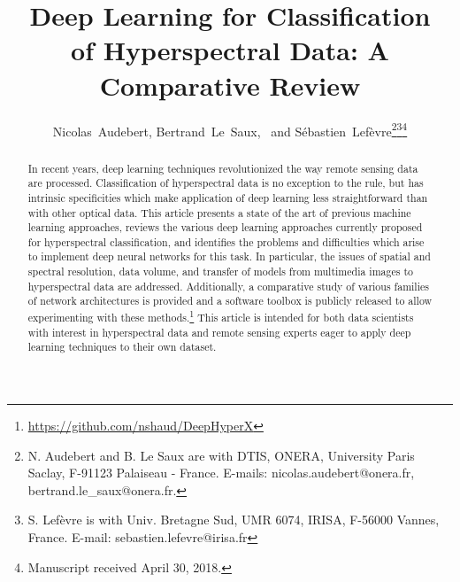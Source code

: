 \documentclass[journal]{IEEEtran}
\begin{document}
\title{Deep Learning for Classification\\ of Hyperspectral Data: A Comparative Review}


\author{Nicolas~Audebert, Bertrand~Le~Saux,~
    and    S{\'e}bastien~Lef{\`e}vre\thanks{N. Audebert and B. {Le Saux} are with DTIS, ONERA, University Paris Saclay, F-91123 Palaiseau - France. E-mails:  \mbox{nicolas.audebert@onera.fr}, \mbox{bertrand.le\_saux@onera.fr}.}\thanks{S. Lef{\`e}vre is with Univ. Bretagne Sud, UMR 6074, IRISA, F-56000 Vannes, France. E-mail: sebastien.lefevre@irisa.fr}\thanks{Manuscript received April 30, 2018.}}























\maketitle



\begin{abstract}
In recent years, deep learning techniques revolutionized the way remote sensing data are processed. Classification of hyperspectral data is no exception to the rule, but has intrinsic specificities which make application of deep learning less straightforward than with other optical data. This article presents a state of the art of previous machine learning approaches, reviews the various deep learning approaches currently proposed for hyperspectral classification, and identifies the problems and difficulties which arise to implement deep neural networks for this task. In particular, the issues of spatial and spectral resolution, data volume, and transfer of models from multimedia images to hyperspectral data are addressed. Additionally, a comparative study of various families of network architectures is provided and a software toolbox is publicly released to allow experimenting with these methods.\footnote{\url{https://github.com/nshaud/DeepHyperX}} 
This article is intended for both data scientists with interest in hyperspectral data and remote sensing experts eager to apply deep learning techniques to their own dataset.
\end{abstract}
\end{document}
